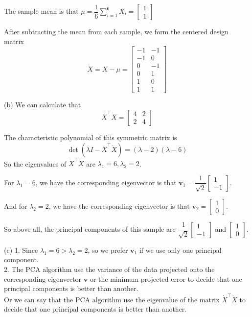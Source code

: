 \documentclass[10pt]{article}
\begin{document}
\begin{enumerate}[1.]
The sample mean is that $\mu=\dfrac{1}{6}\sum\limits_{i=1}^6 X_i=\left[\begin{array}{l}
  1 \\
  1
  \end{array}\right]$

After subtracting the mean from each sample, we form the centered design matrix
$$\dot{X}=X-\mu=
\begin{bmatrix}
  -1 & -1 \\
  -1 & 0 \\
  0 & -1 \\
  0 & 1 \\
  1 & 0 \\
  1 & 1 
\end{bmatrix}
$$

(b) We can calculate that
$$\dot{X}^{\top} \dot{X}=
\begin{bmatrix}
  4 & 2 \\
  2 & 4
\end{bmatrix}$$

The characteristic polynomial of this symmetric matrix is
$$\det(\lambda I - \dot{X}^{\top} \dot{X})=(\lambda-2)(\lambda-6)$$
So the eigenvalues of $\dot{X}^{\top} \dot{X}$ are $\lambda_1=6, \lambda_2=2$.

For $\lambda_1=6$, we have the corresponding eigenvector is that $\mathbf{v}_1=
\dfrac{1}{\sqrt{2}}\begin{bmatrix}
  1 \\
  -1
\end{bmatrix}$.

And for $\lambda_2=2$, we have the corresponding eigenvector is that $\mathbf{v}_2=
\begin{bmatrix}
  1 \\
  0
\end{bmatrix}$.

So above all, the principal components of this sample are 
$\dfrac{1}{\sqrt{2}}\begin{bmatrix}
  1 \\
  -1
\end{bmatrix}$ and $\begin{bmatrix}
  1 \\
  0
\end{bmatrix}$.

(c) 1. Since $\lambda_1=6>\lambda_2=2$, so we prefer $\mathbf{v}_1$ if we use only one principal component.\\

2. The PCA algorithm use the variance of the data projected onto the corresponding eigenvector $\mathbf{v}$ or the minimum projected error to decide that one principal components is better than another.\\
Or we can say that the PCA algorithm use the eigenvalue of the matrix $\dot{X}^{\top} \dot{X}$ to decide that one principal components is better than another.\\


\end{enumerate}
\end{document}
